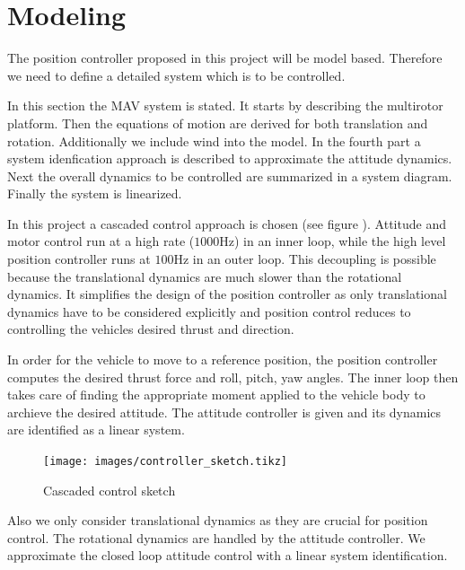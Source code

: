 \chapter{Modeling}
\label{sec:modeling}
The position controller proposed in this project will be model based. Therefore we need to define a detailed system which is to be controlled.

In this section the MAV system is stated. It starts by describing the multirotor platform. Then the equations of motion are derived for both translation and rotation. Additionally we include wind into the model. In the fourth part a system idenfication approach is described to approximate the attitude dynamics. Next the overall dynamics to be controlled are summarized in a system diagram. Finally the system is linearized.

In this project a cascaded control approach is chosen (see figure ). Attitude and motor control run at a high rate ($1000 \si{\hertz}$) in an inner loop, while the high level position controller runs at $100 \si{\hertz}$ in an outer loop. This decoupling is possible because the translational dynamics are much slower than the rotational dynamics. It simplifies the design of the position controller as only translational dynamics have to be considered explicitly and position control reduces to controlling the vehicles desired thrust and direction. 

In order for the vehicle to move to a reference position, the position controller computes the desired thrust force and roll, pitch, yaw angles. The inner loop then takes care of finding the appropriate moment applied to the vehicle body to archieve the desired attitude. The attitude controller is given and its dynamics are identified as a linear system.

\begin{figure}
\centering
\texttt{[image: images/controller\_sketch.tikz]}
\caption{Cascaded control sketch}
\label{pics:controller_sketch}
\end{figure}





Also we only consider translational dynamics as they are crucial for position control. The rotational dynamics are handled by the attitude controller. We approximate the closed loop attitude control with a linear system identification.

